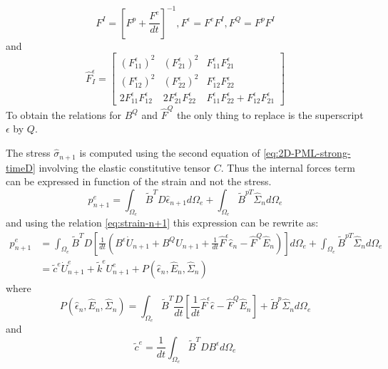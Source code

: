 \begin{equation}
F^I = \left[ F^p+\frac{F^e}{dt} \right]^{-1}, F^\epsilon = F^eF^I, F^Q=F^pF^I
\end{equation}
and
\begin{equation}
\hat{F}^\epsilon_I = \begin{bmatrix}
(F^\epsilon_{11})^2&(F^\epsilon_{21})^2& F^\epsilon_{11}F^\epsilon_{21}\\
(F^\epsilon_{12})^2&(F^\epsilon_{22})^2&F^\epsilon_{12}F^\epsilon_{22}\\
2F^\epsilon_{11}F^\epsilon_{12}&2 F^\epsilon_{21}F^\epsilon_{22}& F^\epsilon_{11}F^\epsilon_{22}+F^\epsilon_{12}F^\epsilon_{21}
\end{bmatrix}
\end{equation}
To obtain the relations for $B^Q$ and $\hat{F}^Q$ the only thing to replace is the superscript $\epsilon$ by $Q$. 
\par The stress $\hat{\sigma}_{n+1}$ is computed using the second equation of \ref{eq:2D-PML-strong-timeD} involving the elastic constitutive tensor $C$. Thus the internal forces term can be expressed in function of the strain and not the stress.
\begin{equation}
p_{n+1}^e = \int_{\Omega_e} \tilde{B}^{T} D \hat{\epsilon}_{n+1} d\Omega_e + \int_{\Omega_e}\tilde{B}^{pT} \hat{\Sigma}_{n} d\Omega_e
\end{equation} 
and using the relation \ref{eq:strain-n+1} this expression can be rewrite as:
\begin{align}
p_{n+1}^e &= \int_{\Omega_e} \tilde{B}^{T} D \left[\frac{1}{dt}\left(B^\epsilon \dot{U}_{n+1} + B^Q U_{n+1} + \frac{1}{dt} \hat{F}^\epsilon \hat{\epsilon}_n - \hat{F}^Q \hat{E}_n\right)  \right] d\Omega_e + \int_{\Omega_e}\tilde{B}^{pT} \hat{\Sigma}_{n} d\Omega_e \\
&= \tilde{c}^e \dot{U}^e_{n+1} + \tilde{k}^e U^e_{n+1} + P(\hat{\epsilon}_n,\hat{E}_n,\hat{\Sigma}_n)
\end{align} 
where 
\begin{equation}
P(\hat{\epsilon}_n,\hat{E}_n,\hat{\Sigma}_n) = \int_{\Omega_e} \tilde{B}^T \frac{D}{dt} \left[\frac{1}{dt}\hat{F}^{\epsilon} \hat{\epsilon} - \hat{F}^Q \hat{E}_n \right] + \tilde{B}^p \hat{\Sigma}_n d\Omega_e
\label{eq:pseudo-intern}
\end{equation}
and 
\begin{equation}
\tilde{c}^{e} = \frac{1}{dt} \int_{\Omega_e} \tilde{B}^T D B^\epsilon d\Omega_e
\label{eq:2Dpml-elem-effdamp}
\end{equation}
